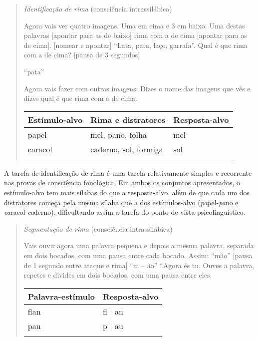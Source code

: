 \documentclass[output=paper,colorlinks,citecolor=brown,booklanguage=portuguese]{langscibook}
\begin{document}
\begin{quote}
\textit{Identificação de rima} (consciência intrassilábica)

Agora vais ver quatro imagens. Uma em cima e 3 em baixo. Uma destas palavras [apontar para as de baixo] rima com a de cima [apontar para as de cima]. [nomear e apontar] “Lata, pata, laço, garrafa”. Qual é que rima com a de cima? [pausa de 3 segundos]

“pata”

Agora vais fazer com outras imagens. Dizes o nome das imagens que vês e dizes qual é que rima com a de cima.



\begin{Tabela}
\begin{tabularx}{.8\textwidth}{Xll}
\lsptoprule
\textbf{Estímulo-alvo} & \textbf{Rima e distratores} & \textbf{Resposta-alvo}\\
\midrule
papel  &  mel, pano, folha & mel\\
caracol  & caderno, sol, formiga & sol\\
\lspbottomrule
\end{tabularx}
\end{Tabela}

\end{quote}

A tarefa de identificação de rima é uma tarefa relativamente simples e recorrente nas provas de consciência fonológica. Em ambos os conjuntos apresentados, o estímulo-alvo tem mais sílabas do que a resposta-alvo, além de que cada um dos distratores começa pela mesma sílaba que a dos estímulos-alvo (\emph{pa}pel-\emph{pa}no e \emph{ca}racol-\emph{ca}derno), dificultando assim a tarefa do ponto de vista psicolinguístico.

\begin{quote}
\textit{Segmentação de rima} (consciência intrassilábica)

Vais ouvir agora uma palavra pequena e depois a mesma palavra, separada em dois bocados, com uma pausa entre cada bocado. Assim: “mão” [pausa de 1 segundo entre ataque e rima] “m – ão” “Agora és tu. Ouves a palavra, repetes e divides em dois bocados, com uma pausa entre eles.



\begin{Tabela}
\begin{tabularx}{.8\textwidth}{Xl}
\lsptoprule
\textbf{Palavra-estímulo} & \textbf{Resposta-alvo}\\
\midrule
flan & fl | an\\
pau & p | au\\
\lspbottomrule
\end{tabularx}
\end{Tabela}

\end{quote}
\end{document}
